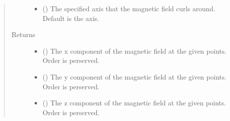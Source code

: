 \documentclass[letterpaper,10pt,english]{sphinxmanual}
\begin{document}
\begin{fulllineitems}
\begin{quote}
\begin{description}
\begin{itemize}
\item {} 
 () \textendash{} The specified axis that the magnetic field curls around. Default is
the  axis.

\end{itemize}

\item[{Returns}] \leavevmode
\begin{itemize}
\item {} 
 () \textendash{} The x component of the magnetic field at the given points. Order
is perserved.

\item {} 
 () \textendash{} The y component of the magnetic field at the given points. Order
is perserved.

\item {} 
 () \textendash{} The z component of the magnetic field at the given points. Order
is perserved.

\end{itemize}


\end{description}\end{quote}

\end{fulllineitems}

\end{document}
